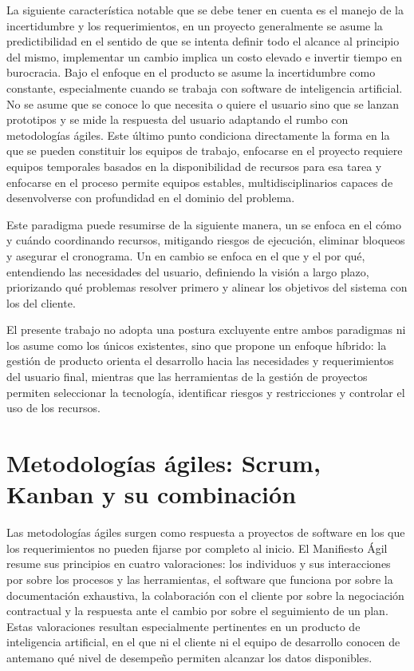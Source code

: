 La siguiente característica notable que se debe tener en cuenta es el manejo de la incertidumbre y los requerimientos, en un proyecto generalmente se asume la predictibilidad en el sentido de que se intenta definir todo el alcance al principio del mismo, implementar un cambio implica un costo elevado e invertir tiempo en burocracia. Bajo el enfoque en el producto se asume la incertidumbre como constante, especialmente cuando se trabaja con software de inteligencia artificial. No se asume que se conoce lo que necesita o quiere el usuario sino que se lanzan prototipos y se mide la respuesta del usuario adaptando el rumbo con metodologías ágiles. Este último punto condiciona directamente la forma en la que se pueden constituir los equipos de trabajo, enfocarse en el proyecto requiere equipos temporales basados en la disponibilidad de recursos para esa tarea y enfocarse en el proceso permite equipos estables, multidisciplinarios capaces de desenvolverse con profundidad en el dominio del problema.

Este paradigma puede resumirse de la siguiente manera, un  se enfoca en el cómo y cuándo coordinando recursos, mitigando riesgos de ejecución, eliminar bloqueos y asegurar el cronograma. Un  en cambio se enfoca en el que y el por qué, entendiendo las necesidades del usuario, definiendo la visión a largo plazo, priorizando qué problemas resolver primero y alinear los objetivos del sistema con los del cliente.

El presente trabajo no adopta una postura excluyente entre ambos paradigmas ni los asume como los únicos existentes, sino que propone un enfoque híbrido: la gestión de producto orienta el desarrollo hacia las necesidades y requerimientos del usuario final, mientras que las herramientas de la gestión de proyectos permiten seleccionar la tecnología, identificar riesgos y restricciones y controlar el uso de los recursos.

\section{Metodologías ágiles: Scrum, Kanban y su combinación}\label{sec:metodologias-agiles}

Las metodologías ágiles surgen como respuesta a proyectos de software en los que los requerimientos no pueden fijarse por completo al inicio. El Manifiesto Ágil \parencite{beck2001} resume sus principios en cuatro valoraciones: los individuos y sus interacciones por sobre los procesos y las herramientas, el software que funciona por sobre la documentación exhaustiva, la colaboración con el cliente por sobre la negociación contractual y la respuesta ante el cambio por sobre el seguimiento de un plan. Estas valoraciones resultan especialmente pertinentes en un producto de inteligencia artificial, en el que ni el cliente ni el equipo de desarrollo conocen de antemano qué nivel de desempeño permiten alcanzar los datos disponibles.


